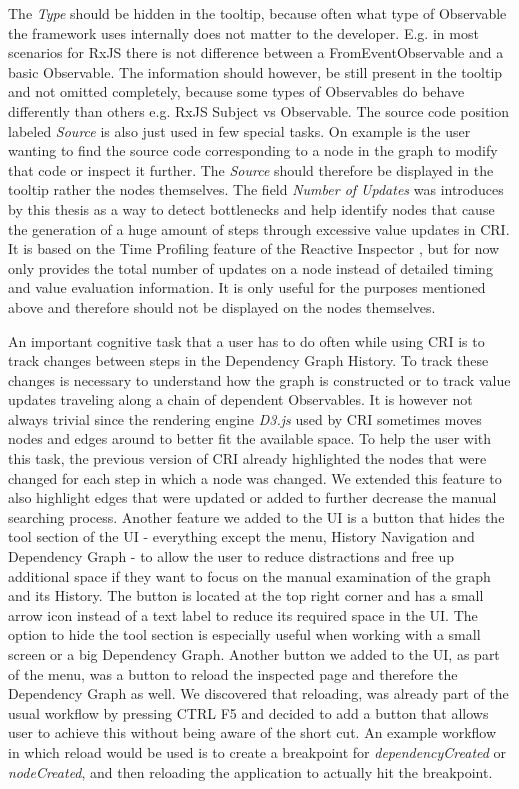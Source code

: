 The \emph{Type} should be hidden in the tooltip, because often what type of Observable the framework uses internally does not matter to the developer. E.g. in most scenarios for RxJS there is not difference between a FromEventObservable and a basic Observable. The information should however, be still present in the tooltip and not omitted completely, because some types of Observables do behave differently than others e.g. RxJS Subject vs Observable. The source code position labeled \emph{Source} is also just used in few special tasks. On example is the user wanting to find the source code corresponding to a node in the graph to modify that code or inspect it further. The \emph{Source} should therefore be displayed in the tooltip rather the nodes themselves. The field \emph{Number of Updates} was introduces by this thesis as a way to detect bottlenecks and help identify nodes that cause the generation of a huge amount of steps through excessive value updates in CRI. It is based on the Time Profiling feature of the Reactive Inspector \cite{ReactiveInspector}, but for now only provides the total number of updates on a node instead of detailed timing and value evaluation information. It is only useful for the purposes mentioned above and therefore should not be displayed on the nodes themselves.

An important cognitive task that a user has to do often while using CRI is to track changes between steps in the Dependency Graph History. To track these changes is necessary to understand how the graph is constructed or to track value updates traveling along a chain of dependent Observables. It is however not always trivial since the rendering engine \emph{D3.js} \cite{D3JS} used by CRI sometimes moves nodes and edges around to better fit the available space. To help the user with this task, the previous version of CRI already highlighted the nodes that were changed for each step in which a node was changed. We extended this feature to also highlight edges that were updated or added to further decrease the manual searching process. Another feature we added to the UI is a button that hides the tool section of the UI - everything except the menu, History Navigation and Dependency Graph - to allow the user to reduce distractions and free up additional space if they want to focus on the manual examination of the graph and its History. The button is located at the top right corner and has a small arrow icon instead of a text label to reduce its required space in the UI. The option to hide the tool section is especially useful when working with a small screen or a big Dependency Graph. Another button we added to the UI, as part of the menu, was a button to reload the inspected page and therefore the Dependency Graph as well. We discovered that reloading, was already part of the usual workflow by pressing CTRL F5 and decided to add a button that allows user to achieve this without being aware of the short cut. An example workflow in which reload would be used is to create a breakpoint for \emph{dependencyCreated} or \emph{nodeCreated}, and then reloading the application to actually hit the breakpoint.


